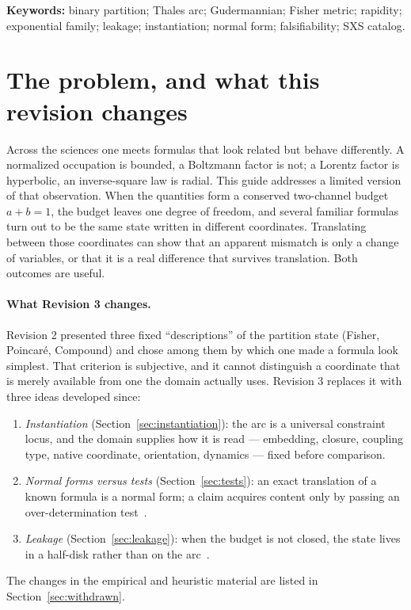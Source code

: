 \documentclass[11pt]{article}
\theoremstyle{definition}
\theoremstyle{remark}
\begin{document}
\noindent\textbf{Keywords:} binary partition; Thales arc; Gudermannian; Fisher metric;
rapidity; exponential family; leakage; instantiation; normal form; falsifiability;
SXS catalog.

\tableofcontents

\section{The problem, and what this revision changes}\label{sec:intro}

Across the sciences one meets formulas that look related but behave differently. A
normalized occupation is bounded, a Boltzmann factor is not; a Lorentz factor is hyperbolic,
an inverse-square law is radial. This guide addresses a limited version of that observation.
When the quantities form a conserved two-channel budget $a+b=1$, the budget leaves one
degree of freedom, and several familiar formulas turn out to be the same state written in
different coordinates. Translating between those coordinates can show that an apparent
mismatch is only a change of variables, or that it is a real difference that survives
translation. Both outcomes are useful.

\paragraph{What Revision 3 changes.} Revision 2 presented three fixed ``descriptions'' of the
partition state (Fisher, Poincar\'e, Compound) and chose among them by which one made a
formula look simplest. That criterion is subjective, and it cannot distinguish a coordinate
that is merely available from one the domain actually uses. Revision 3 replaces it with
three ideas developed since:
\begin{enumerate}\sloppy
\item \emph{Instantiation} (Section~\ref{sec:instantiation}): the arc is a universal
constraint locus, and the domain supplies how it is read --- embedding, closure, coupling
type, native coordinate, orientation, dynamics --- fixed before comparison.
\item \emph{Normal forms versus tests} (Section~\ref{sec:tests}): an exact translation of a
known formula is a normal form; a claim acquires content only by passing an
over-determination test~\cite{DeJesus2026EP}.
\item \emph{Leakage} (Section~\ref{sec:leakage}): when the budget is not closed, the state
lives in a half-disk rather than on the arc~\cite{DeJesus2026Fiber,DeJesus2026HL}.
\end{enumerate}
The changes in the empirical and heuristic material are listed in
Section~\ref{sec:withdrawn}.
\end{document}
